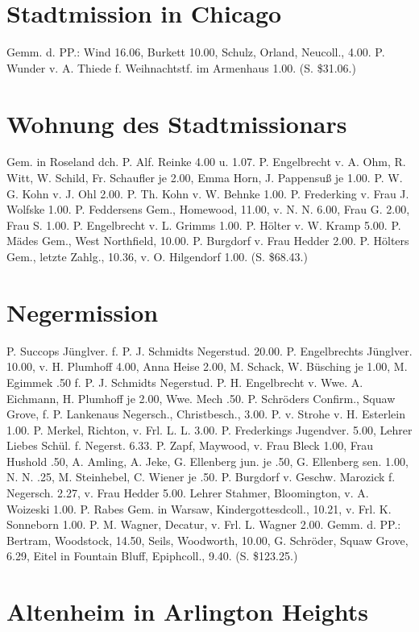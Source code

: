 \section{Stadtmission in Chicago}

Gemm. d. PP.: Wind 16.06, Burkett 10.00, Schulz, Orland, Neucoll., 4.00. P. Wunder v. A. Thiede f. Weihnachtstf. im Armenhaus 1.00. (S. \$31.06.)

\section{Wohnung des Stadtmissionars}

Gem. in Roseland dch. P. Alf. Reinke 4.00 u. 1.07. P. Engelbrecht v. A. Ohm, R. Witt, W. Schild, Fr. Schaufler je 2.00, Emma Horn, J. Pappensuß je 1.00. P. W. G. Kohn v. J. Ohl 2.00. P. Th. Kohn v. W. Behnke 1.00. P. Frederking v. Frau J. Wolfske 1.00. P. Feddersens Gem., Homewood, 11.00, v. N. N. 6.00, Frau G. 2.00, Frau S. 1.00. P. Engelbrecht v. L. Grimms 1.00. P. Hölter v. W. Kramp 5.00. P. Mädes Gem., West Northfield, 10.00. P. Burgdorf v. Frau Hedder 2.00. P. Hölters Gem., letzte Zahlg., 10.36, v. O. Hilgendorf 1.00. (S. \$68.43.)

\section{Negermission}

P. Succops Jünglver. f. P. J. Schmidts Negerstud. 20.00. P. Engelbrechts Jünglver. 10.00, v. H. Plumhoff 4.00, Anna Heise 2.00, M. Schack, W. Büsching je 1.00, M. Egimmek .50 f. P. J. Schmidts Negerstud. P. H. Engelbrecht v. Wwe. A. Eichmann, H. Plumhoff je 2.00, Wwe. Mech .50. P. Schröders Confirm., Squaw Grove, f. P. Lankenaus Negersch., Christbesch., 3.00. P. v. Strohe v. H. Esterlein 1.00. P. Merkel, Richton, v. Frl. L. L. 3.00. P. Frederkings Jugendver. 5.00, Lehrer Liebes Schül. f. Negerst. 6.33. P. Zapf, Maywood, v. Frau Bleck 1.00, Frau Hushold .50, A. Amling, A. Jeke, G. Ellenberg jun. je .50, G. Ellenberg sen. 1.00, N. N. .25, M. Steinhebel, C. Wiener je .50. P. Burgdorf v. Geschw. Marozick f. Negersch. 2.27, v. Frau Hedder 5.00. Lehrer Stahmer, Bloomington, v. A. Woizeski 1.00. P. Rabes Gem. in Warsaw, Kindergottesdcoll., 10.21, v. Frl. K. Sonneborn 1.00. P. M. Wagner, Decatur, v. Frl. L. Wagner 2.00. Gemm. d. PP.: Bertram, Woodstock, 14.50, Seils, Woodworth, 10.00, G. Schröder, Squaw Grove, 6.29, Eitel in Fountain Bluff, Epiphcoll., 9.40. (S. \$123.25.)

\section{Altenheim in Arlington Heights}

